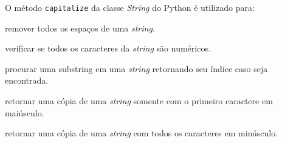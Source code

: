 {%

\item \rtask \ponto{\pt} %
O método \lstinline[style=Python]|capitalize| da classe \textit{String} do Python é utilizado para: 

\begin{answerlist}[label={\texttt{\Alph*}.},leftmargin=*]
    \ti remover todos os espaços de uma \textit{string}.
    
    \ti verificar se todos os caracteres da \textit{string} são numéricos.
    
    \ti procurar uma substring em uma \textit{string} retornando seu índice caso seja encontrada.
    
    \di retornar uma cópia de uma \textit{string} somente com o primeiro caractere em maiúsculo.
    
    \ti retornar uma cópia de uma \textit{string} com todos os caracteres em minúsculo.
\end{answerlist}

}

